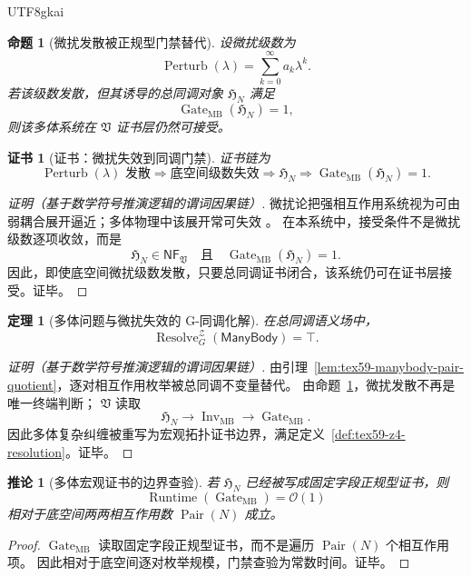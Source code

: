 \documentclass[12pt]{article}
\newtheorem{theorem}{定理}[section]
\newtheorem{proposition}{命题}[section]
\newtheorem{corollary}{推论}[section]
\newtheorem{Certificate}{证书}[section]
\newcommand{\Vsys}{\mathfrak V}
\newcommand{\NF}{\mathsf{NF}}
\DeclareMathOperator{\Resolve}{Resolve}
\DeclareMathOperator{\Gate}{Gate}
\DeclareMathOperator{\Inv}{Inv}
\DeclareMathOperator{\Runtime}{Runtime}
\DeclareMathOperator{\Perturb}{Perturb}
\DeclareMathOperator{\Pair}{Pair}
\begin{document}
\begin{CJK*}{UTF8}{gkai}
\begin{proposition}[微扰发散被正规型门禁替代]
\label{prop:tex59-perturbation-gate}
设微扰级数为
\[
  \Perturb(\lambda)=\sum_{k=0}^{\infty}a_k\lambda^k.
\]
若该级数发散，但其诱导的总同调对象 \(\mathfrak H_N\) 满足
\[
  \Gate_{\mathrm{MB}}(\mathfrak H_N)=1,
\]
则该多体系统在 \(\Vsys\) 证书层仍然可接受。
\end{proposition}

\begin{Certificate}[证书：微扰失效到同调门禁]
\label{cert:tex59-perturbation-gate}
证书链为
\[
  \Perturb(\lambda)\text{ 发散}
  \Longrightarrow
  \text{底空间级数失效}
  \Longrightarrow
  \mathfrak H_N
  \Longrightarrow
  \Gate_{\mathrm{MB}}(\mathfrak H_N)=1.
\]
\end{Certificate}

\begin{proof}[证明（基于数学符号推演逻辑的谓词因果链）]
微扰论把强相互作用系统视为可由弱耦合展开逼近；多体物理中该展开常可失效
\cite{FetterWalecka1971ManyParticle,NegeleOrland1988QuantumManyParticle}。
在本系统中，接受条件不是微扰级数逐项收敛，而是
\[
  \mathfrak H_N\in\NF_{\Vsys}
  \quad\text{且}\quad
  \Gate_{\mathrm{MB}}(\mathfrak H_N)=1.
\]
因此，即使底空间微扰级数发散，只要总同调证书闭合，该系统仍可在证书层接受。证毕。
\end{proof}

\begin{theorem}[多体问题与微扰失效的 G-同调化解]
\label{thm:tex59-manybody-resolution}
在总同调语义场中，
\[
  \Resolve_G^{\mathcal Z}(\mathsf{ManyBody})=\top.
\]
\end{theorem}

\begin{proof}[证明（基于数学符号推演逻辑的谓词因果链）]
由引理~\ref{lem:tex59-manybody-pair-quotient}，逐对相互作用枚举被总同调不变量替代。
由命题~\ref{prop:tex59-perturbation-gate}，微扰发散不再是唯一终端判断；
\(\Vsys\) 读取
\[
  \mathfrak H_N
  \to
  \Inv_{\mathrm{MB}}
  \to
  \Gate_{\mathrm{MB}}.
\]
因此多体复杂纠缠被重写为宏观拓扑证书边界，满足定义~\ref{def:tex59-z4-resolution}。证毕。
\end{proof}

\begin{corollary}[多体宏观证书的边界查验]
\label{cor:tex59-manybody-o1-gate}
若 \(\mathfrak H_N\) 已经被写成固定字段正规型证书，则
\[
  \Runtime(\Gate_{\mathrm{MB}})=\mathcal O(1)
\]
相对于底空间两两相互作用数 \(\Pair(N)\) 成立。
\end{corollary}

\begin{proof}
\(\Gate_{\mathrm{MB}}\) 读取固定字段正规型证书，而不是遍历 \(\Pair(N)\) 个相互作用项。
因此相对于底空间逐对枚举规模，门禁查验为常数时间。证毕。
\end{proof}


\end{CJK*}
\end{document}
